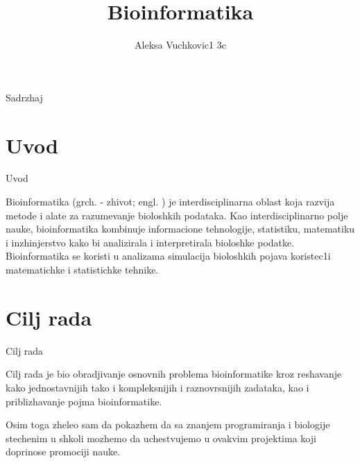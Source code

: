 \documentclass[9pt]{beamer}
\title{\textbf{Bioinformatika}}
\author{Aleksa Vuchkovic1 3c}
\institute{\normalsize Matematichka gimnazija, Beograd}
\date{}
\newcommand\eng{\fontencoding{OT1}\fontfamily{\rmdefault}\selectfont}
\newcommand\srb{\fontencoding{OT2}\fontfamily{\rmdefault}\selectfont}
\begin{document}
\maketitle

\begin{frame}{Sadrzhaj}
\tableofcontents
\end{frame}

\section{Uvod} %
\begin{frame}{Uvod}
\begin{block}{}
Bioinformatika (grch. \eng{bios}\srb{} - zhivot; engl. \eng{informatics}\srb{}) je interdisciplinarna oblast koja razvija metode i alate za razumevanje bioloshkih podataka. Kao interdisciplinarno polje nauke, bioinformatika kombinuje informacione tehnologije, statistiku, matematiku i inzhinjerstvo kako bi analizirala i interpretirala bioloshke podatke. Bioinformatika se koristi u analizama simulacija bioloshkih pojava koristec1i matematichke i statistichke tehnike.
\end{block}
\end{frame}
\section{Cilj rada} %
\begin{frame}{Cilj rada}
\begin{block}{}
Cilj rada je bio obradjivanje osnovnih problema bioinformatike kroz reshavanje kako jednostavnijih tako i kompleksnijih i raznovrsnijih zadataka, kao i priblizhavanje pojma bioinformatike.
\end{block}
\begin{block}{}
Osim toga zheleo sam da pokazhem da sa znanjem programiranja i biologije stechenim u shkoli mozhemo da uchestvujemo u ovakvim projektima koji doprinose promociji nauke.
\end{block}
\end{frame}
\end{document}
